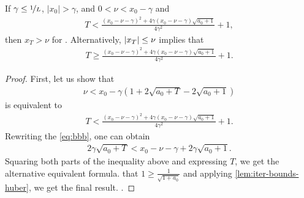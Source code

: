 \documentclass{article}
\begin{document}
\begin{corollary}\label{col: bound-iterates}
    If $\gamma \leq \nicefrac{1}{L}$, $|x_0| > \gamma$, and $0 < \nu < x_0 - \gamma$ and   
    \begin{align*}
        T < \frac{(x_0 - \nu - \gamma)^2 + 4\gamma(x_0 - \nu - \gamma)\sqrt{a_0 + 1}}{4\gamma^2} + 1, 
    \end{align*}
    then $x_T > \nu$ for  . Alternatively, $\left\lvert x_T\right\rvert \leq \nu$ implies that
    \begin{align*}
        T \geq \frac{(x_0 - \nu - \gamma)^2 + 4\gamma(x_0 - \nu - \gamma)\sqrt{a_0 + 1}}{4\gamma^2} + 1.
    \end{align*}
\end{corollary}
\begin{proof}
    First, let us show that
    \begin{align}
    \label{eq:bbb}
        \nu < x_0 - \gamma\left(1 + 2\sqrt{a_0 + T} - 2\sqrt{a_0 + 1}\right)
    \end{align}
    is equivalent to
    \begin{align*}
        T < \frac{(x_0 - \nu - \gamma)^2 + 4\gamma(x_0 - \nu - \gamma)\sqrt{a_0 + 1}}{4\gamma^2} + 1.
    \end{align*}
    Rewriting the \eqref{eq:bbb}, one can obtain
    \begin{align*}
        2\gamma\sqrt{a_0 + T} < x_0 - \nu - \gamma + 2\gamma\sqrt{a_0 + 1}.
    \end{align*}
    Squaring both parts of the inequality above and expressing $T$, we get the alternative equivalent formula.  that $1 \geq \frac{1}{\sqrt{1 + a_0}}$ and applying \cref{lem:iter-bounds-huber}, we get the final result. .
\end{proof}

\end{document}
